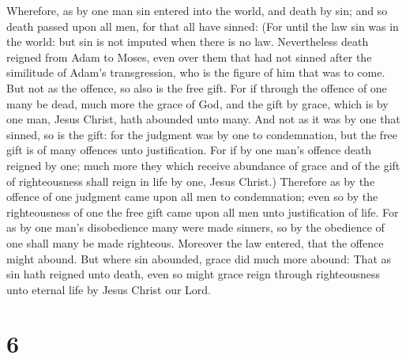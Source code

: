  Wherefore, as by one man sin entered into the world, and
death by sin; and so death passed upon all men, for that all have
sinned:  (For until the law sin was in the world: but sin
is not imputed when there is no law.  Nevertheless death
reigned from Adam to Moses, even over them that had not sinned after the
similitude of Adam's transgression, who is the figure of him that was to
come.  But not as the offence, so also is the free gift.
For if through the offence of one many be dead, much more the grace of
God, and the gift by grace, which is by one man, Jesus Christ, hath
abounded unto many.  And not as it was by one that
sinned, so is the gift: for the judgment was by one to condemnation, but
the free gift is of many offences unto justification. 
For if by one man's offence death reigned by one; much more they which
receive abundance of grace and of the gift of righteousness shall reign
in life by one, Jesus Christ.)  Therefore as by the
offence of one judgment came upon all men to condemnation; even so by
the righteousness of one the free gift came upon all men unto
justification of life.  For as by one man's disobedience
many were made sinners, so by the obedience of one shall many be made
righteous.  Moreover the law entered, that the offence
might abound. But where sin abounded, grace did much more abound:
 That as sin hath reigned unto death, even so might grace
reign through righteousness unto eternal life by Jesus Christ our Lord.

\hypertarget{section-5}{%
\section{6}\label{section-5}}

